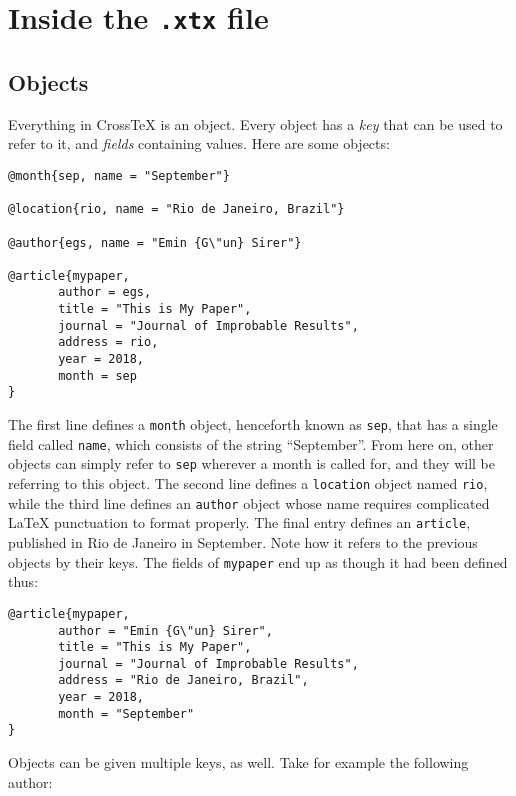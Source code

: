 \documentclass{article}
\newcommand{\XTeX}{Cross\TeX}
\begin{document}
\section{Inside the \texttt{.xtx} file}


\subsection{Objects}

Everything in \XTeX{} is an object. Every object has a \textit{key} that can be used to refer to it, and \textit{fields} containing values. Here are some objects:

\begin{small}\begin{verbatim}
@month{sep, name = "September"}

@location{rio, name = "Rio de Janeiro, Brazil"}

@author{egs, name = "Emin {G\"un} Sirer"}

@article{mypaper,
	   author = egs,
	   title = "This is My Paper",
	   journal = "Journal of Improbable Results",
	   address = rio,
	   year = 2018,
	   month = sep
}
\end{verbatim}\end{small}

The first line defines a \texttt{month} object, henceforth known as \texttt{sep}, that has a single field called \texttt{name}, which consists of the string ``September''. From here on, other objects can simply refer to \texttt{sep} wherever a month is called for, and they will be referring to this object. The second line defines a \texttt{location} object named \texttt{rio}, while the third line defines an \texttt{author} object whose name requires complicated \LaTeX{} punctuation to format properly. The final entry defines an \texttt{article}, published in Rio de Janeiro in September. Note how it refers to the previous objects by their keys. The fields of \texttt{mypaper} end up as though it had been defined thus:

\begin{small}\begin{verbatim}
@article{mypaper,
	   author = "Emin {G\"un} Sirer",
	   title = "This is My Paper",
	   journal = "Journal of Improbable Results",
	   address = "Rio de Janeiro, Brazil",
	   year = 2018,
	   month = "September"
}
\end{verbatim}\end{small}

Objects can be given multiple keys, as well. Take for example the following author:
\end{document}
